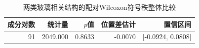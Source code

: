 \begin{table}[H]
  \centering
  \caption{两类玻璃相关结构的配对Wilcoxon符号秩整体比较}
  \label{tab:p4-global-test}
  \small
  \begin{tabular}{rrrrr}
    \toprule
    成分对数 & 统计量 & $p$值 & 位置差估计 & 置信区间 \\
    \midrule
    91 & 2049.000 & 0.8633 & -0.0070 & [-0.0924, 0.0808] \\
    \bottomrule
  \end{tabular}
\end{table}


